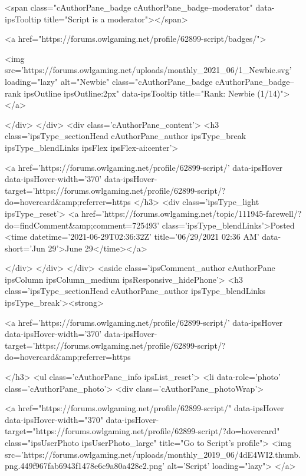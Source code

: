 				
				<span class="cAuthorPane_badge cAuthorPane_badge--moderator" data-ipsTooltip title="Script is a moderator"></span>
				
				
					<a href="https://forums.owlgaming.net/profile/62899-script/badges/">
						
<img src='https://forums.owlgaming.net/uploads/monthly_2021_06/1_Newbie.svg' loading="lazy" alt="Newbie" class="cAuthorPane_badge cAuthorPane_badge--rank ipsOutline ipsOutline:2px" data-ipsTooltip title="Rank: Newbie (1/14)">
					</a>
				
			</div>
		</div>
		<div class='cAuthorPane_content'>
			<h3 class='ipsType_sectionHead cAuthorPane_author ipsType_break ipsType_blendLinks ipsFlex ipsFlex-ai:center'>
				


<a href='https://forums.owlgaming.net/profile/62899-script/' data-ipsHover data-ipsHover-width='370' data-ipsHover-target='https://forums.owlgaming.net/profile/62899-script/?do=hovercard&amp;referrer=https%
			</h3>
			<div class='ipsType_light ipsType_reset'>
				<a href='https://forums.owlgaming.net/topic/111945-farewell/?do=findComment&amp;comment=725493' class='ipsType_blendLinks'>Posted <time datetime='2021-06-29T02:36:32Z' title='06/29/2021 02:36  AM' data-short='Jun 29'>June 29</time></a>
				
			</div>
		</div>
	</div>
	<aside class='ipsComment_author cAuthorPane ipsColumn ipsColumn_medium ipsResponsive_hidePhone'>
		<h3 class='ipsType_sectionHead cAuthorPane_author ipsType_blendLinks ipsType_break'><strong>


<a href='https://forums.owlgaming.net/profile/62899-script/' data-ipsHover data-ipsHover-width='370' data-ipsHover-target='https://forums.owlgaming.net/profile/62899-script/?do=hovercard&amp;referrer=https%
			
		</h3>
		<ul class='cAuthorPane_info ipsList_reset'>
			<li data-role='photo' class='cAuthorPane_photo'>
				<div class='cAuthorPane_photoWrap'>
					


	<a href="https://forums.owlgaming.net/profile/62899-script/" data-ipsHover data-ipsHover-width="370" data-ipsHover-target="https://forums.owlgaming.net/profile/62899-script/?do=hovercard" class="ipsUserPhoto ipsUserPhoto_large" title="Go to Script's profile">
		<img src='https://forums.owlgaming.net/uploads/monthly_2019_06/4dE4WI2.thumb.png.449f967fab6943f1478e6c9a80a428e2.png' alt='Script' loading="lazy">
	</a>

